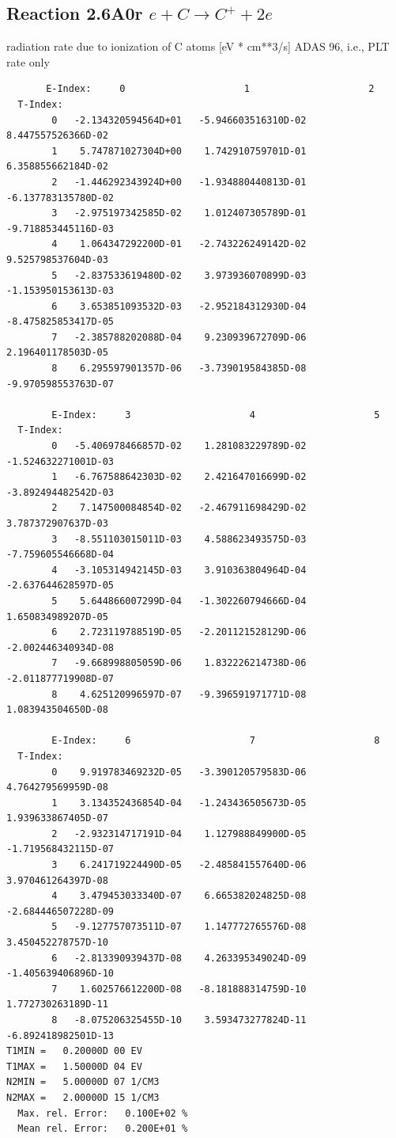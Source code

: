 \documentclass[12pt,dvipdfmx]{article}
\begin{document}
\subsection{
  Reaction 2.6A0r  $e + C  \rightarrow C^+   + 2e $
}
radiation rate due to ionization of C atoms [eV * cm**3/s]
ADAS 96, i.e., PLT rate only

\begin{small}\begin{verbatim}
       E-Index:     0                     1                     2
  T-Index:
        0   -2.134320594564D+01   -5.946603516310D-02    8.447557526366D-02
        1    5.747871027304D+00    1.742910759701D-01    6.358855662184D-02
        2   -1.446292343924D+00   -1.934880440813D-01   -6.137783135780D-02
        3   -2.975197342585D-02    1.012407305789D-01   -9.718853445116D-03
        4    1.064347292200D-01   -2.743226249142D-02    9.525798537604D-03
        5   -2.837533619480D-02    3.973936070899D-03   -1.153950153613D-03
        6    3.653851093532D-03   -2.952184312930D-04   -8.475825853417D-05
        7   -2.385788202088D-04    9.230939672709D-06    2.196401178503D-05
        8    6.295597901357D-06   -3.739019584385D-08   -9.970598553763D-07

        E-Index:     3                     4                     5
  T-Index:
        0   -5.406978466857D-02    1.281083229789D-02   -1.524632271001D-03
        1   -6.767588642303D-02    2.421647016699D-02   -3.892494482542D-03
        2    7.147500084854D-02   -2.467911698429D-02    3.787372907637D-03
        3   -8.551103015011D-03    4.588623493575D-03   -7.759605546668D-04
        4   -3.105314942145D-03    3.910363804964D-04   -2.637644628597D-05
        5    5.644866007299D-04   -1.302260794666D-04    1.650834989207D-05
        6    2.723119788519D-05   -2.201121528129D-06   -2.002446340934D-08
        7   -9.668998805059D-06    1.832226214738D-06   -2.011877719908D-07
        8    4.625120996597D-07   -9.396591971771D-08    1.083943504650D-08

        E-Index:     6                     7                     8
  T-Index:
        0    9.919783469232D-05   -3.390120579583D-06    4.764279569959D-08
        1    3.134352436854D-04   -1.243436505673D-05    1.939633867405D-07
        2   -2.932314717191D-04    1.127988849900D-05   -1.719568432115D-07
        3    6.241719224490D-05   -2.485841557640D-06    3.970461264397D-08
        4    3.479453033340D-07    6.665382024825D-08   -2.684446507228D-09
        5   -9.127757073511D-07    1.147772765576D-08    3.450452278757D-10
        6   -2.813390939437D-08    4.263395349024D-09   -1.405639406896D-10
        7    1.602576612200D-08   -8.181888314759D-10    1.772730263189D-11
        8   -8.075206325455D-10    3.593473277824D-11   -6.892418982501D-13
T1MIN =   0.20000D 00 EV
T1MAX =   1.50000D 04 EV
N2MIN =   5.00000D 07 1/CM3
N2MAX =   2.00000D 15 1/CM3
  Max. rel. Error:   0.100E+02 %
  Mean rel. Error:   0.200E+01 %

\end{verbatim}\end{small}
\end{document}
